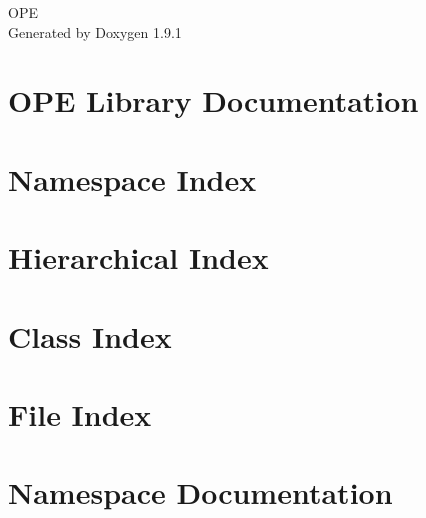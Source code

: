 \let\mypdfximage\pdfximage\def\pdfximage{\immediate\mypdfximage}\documentclass[twoside]{book}
\newcommand{\+}{\discretionary{\mbox{\scriptsize$\hookleftarrow$}}{}{}}
\newcommand{\clearemptydoublepage}{%
  \newpage{\pagestyle{empty}\cleardoublepage}%
}
\begin{document}
\raggedbottom

\hypersetup{pageanchor=false,
             bookmarksnumbered=true,
             pdfencoding=unicode
            }
\begin{titlepage}
\vspace*{7cm}
\begin{center}%
{\Large OPE }\\
\vspace*{1cm}
{\large Generated by Doxygen 1.9.1}\\
\end{center}
\end{titlepage}
\clearemptydoublepage
{}
\tableofcontents
\clearemptydoublepage
{}
\hypersetup{pageanchor=true}

\chapter{OPE Library Documentation}
\label{index}\hypertarget{index}{}
\chapter{Namespace Index}

\chapter{Hierarchical Index}

\chapter{Class Index}

\chapter{File Index}

\chapter{Namespace Documentation}








\end{document}
